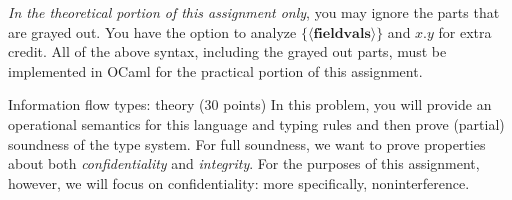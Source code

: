 \documentclass[11pt]{article}
\begin{document}
\emph{In the theoretical portion of this assignment only}, you may ignore the parts that are grayed out. You have the option to analyze $\{\langle\mathbf{fieldvals}\rangle\}$ and $x.y$ for extra credit. All of the above syntax, including the grayed out parts, must be implemented in OCaml for the practical portion of this assignment.

\begin{problem}{Information flow types: theory (30 points)}
In this problem, you will provide an operational semantics for this language and typing rules and then prove (partial) soundness of the type system. For full soundness, we want to prove properties about both \emph{confidentiality} and \emph{integrity}. For the purposes of this assignment, however, we will focus on confidentiality: more specifically, noninterference.


\end{problem}
\end{document}
